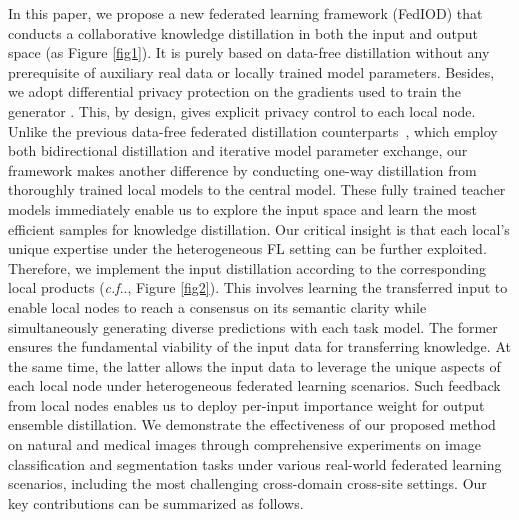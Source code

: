 \documentclass[letterpaper]{article} %
\makeatletter
\DeclareRobustCommand\onedot{\futurelet\@let@token\@onedot}
\def\@onedot{\ifx\@let@token.\else.\null\fi\xspace}
\def\cf{\emph{c.f}\onedot} \def\Cf{\emph{C.f}\onedot}
\makeatother
\begin{document}
In this paper, we propose a new federated learning framework  (FedIOD) that conducts a collaborative knowledge distillation in both the input and output space (as Figure \ref{fig1}).
It is purely based on data-free distillation without any prerequisite of auxiliary real data or locally trained model parameters. Besides, we adopt differential privacy protection on the gradients used to train the generator \cite{torkzadehmahani2019dp, chen2020gs}.
This, by design, gives explicit privacy control to each local node. %
Unlike the previous data-free federated distillation counterparts~\cite{zhu2021data, zhang2022fedzkt, zhang2022fine}, which employ both bidirectional distillation and iterative model parameter exchange, our framework makes another difference by conducting one-way distillation from thoroughly trained local models to the central model. These fully trained teacher models immediately enable us to explore the input space and learn the most efficient samples for knowledge distillation. Our critical insight is that each local's unique expertise under the heterogeneous FL setting can be further exploited. Therefore, we implement the input distillation according to the corresponding local products (\cf, Figure \ref{fig2}). This involves learning the transferred input to enable local nodes to reach a consensus on its semantic clarity while simultaneously generating diverse predictions with each task model. The former ensures the fundamental viability of the input data for transferring knowledge. At the same time, the latter allows the input data to leverage the unique aspects of each local node under heterogeneous federated learning scenarios.
Such feedback from local nodes enables us to deploy per-input importance weight for output ensemble distillation.
We demonstrate the effectiveness of our proposed method on natural and medical images through comprehensive experiments on image classification and segmentation tasks under various real-world federated learning scenarios, including the most challenging cross-domain cross-site settings. %
Our key contributions can be summarized as follows.
\end{document}
